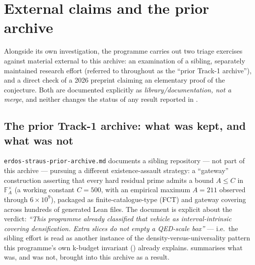 \documentclass[11pt]{article}
\theoremstyle{plain}
\theoremstyle{definition}
\theoremstyle{remark}
\renewcommand{\_}{\textunderscore\allowbreak}
\begin{document}
\section{External claims and the prior archive}
\label{sec:prior}

Alongside its own investigation, the programme carries out two triage exercises against material
external to this archive: an examination of a sibling, separately maintained research effort
(referred to throughout as the ``prior Track-1 archive''), and a direct check of a 2026 preprint
claiming an elementary proof of the conjecture. Both are documented explicitly as
\emph{library/documentation, not a merge}, and neither changes the status of any result reported
in .

\subsection{The prior Track-1 archive: what was kept, and what was not}
\label{subsec:prior-archive}

\texttt{erdos-\allowbreak straus-\allowbreak prior-\allowbreak archive.md} documents a sibling repository — not part of this
archive — pursuing a different existence-assault strategy: a ``gateway'' construction asserting
that every hard residual prime admits a bound $A\le C$ in $\mathbb F_A^\times$ (a working
constant $C=500$, with an empirical maximum $A=211$ observed through $6\times10^9$), packaged as
finite-catalogue-type (FCT) and gateway covering across hundreds of generated Lean files. The
document is explicit about the verdict: \emph{``This programme already classified that vehicle
as interval-intrinsic covering densification. Extra slices do not empty a QED-scale box''} — i.e.\
the sibling effort is read as another instance of the density-versus-universality pattern this
programme's own k-budget invariant (\Cref{subsec:kbudget}) already explains. \Cref{tab:prior}
summarises what was, and was not, brought into this archive as a result.
\end{document}
